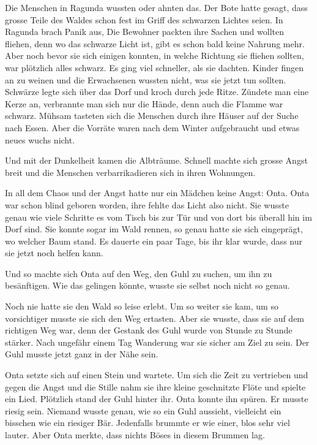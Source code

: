 Die Menschen in Ragunda wussten oder ahnten das. Der Bote hatte gesagt, dass grosse Teile des Waldes schon fest im Griff des schwarzen Lichtes seien. In Ragunda brach Panik aus, Die Bewohner packten ihre Sachen und wollten fliehen, denn wo das schwarze Licht ist, gibt es schon bald keine Nahrung mehr. Aber noch bevor sie sich einigen konnten, in welche Richtung sie fliehen sollten, war plötzlich alles schwarz. Es ging viel schneller, als sie dachten. Kinder fingen an zu weinen und die Erwachsenen wussten nicht, was sie jetzt tun sollten. Schwärze legte sich über das Dorf und kroch durch jede Ritze. Zündete man eine Kerze an, verbrannte man sich nur die Hände, denn auch die Flamme war schwarz. Mühsam tasteten sich die Menschen durch ihre Häuser auf der Suche nach Essen. Aber die Vorräte waren nach dem Winter aufgebraucht und etwas neues wuchs nicht.

Und mit der Dunkelheit kamen die Albträume. Schnell machte sich grosse Angst breit und die Menschen verbarrikadieren sich in ihren Wohnungen. 

In all dem Chaos und der Angst hatte nur ein Mädchen keine Angst: Onta. Onta war schon blind geboren worden, ihre fehlte das Licht also nicht. Sie wusste genau wie viele Schritte es vom Tisch bis zur Tür und von dort bis überall hin im Dorf sind. Sie konnte sogar im Wald rennen, so genau hatte sie sich eingeprägt, wo welcher Baum stand. Es dauerte ein paar Tage, bis ihr klar wurde, dass nur sie jetzt noch helfen kann.

Und so machte sich Onta auf den Weg, den Guhl zu suchen, um ihn zu besänftigen. Wie das gelingen könnte, wusste sie selbst noch nicht so genau. 

Noch nie hatte sie den Wald so leise erlebt. Um so weiter sie kam, um so vorsichtiger musste sie sich den Weg ertasten. Aber sie wusste, dass sie auf dem richtigen Weg war, denn der Gestank des Guhl wurde von Stunde zu Stunde stärker. Nach ungefähr einem Tag Wanderung war sie sicher am Ziel zu sein. Der Guhl musste jetzt ganz in der Nähe sein.

Onta setzte sich auf einen Stein und wartete. Um sich die Zeit zu vertrieben und gegen die Angst und die Stille nahm sie ihre kleine geschnitzte Flöte und spielte ein Lied. Plötzlich stand der Guhl hinter ihr. Onta konnte ihn spüren. Er musste riesig sein. Niemand wusste genau, wie so ein Guhl aussieht, vielleicht ein bisschen wie ein riesiger Bär. Jedenfalls brummte er wie einer, blos sehr viel lauter. Aber Onta merkte, dass nichts Böses in diesem Brummen lag. 

